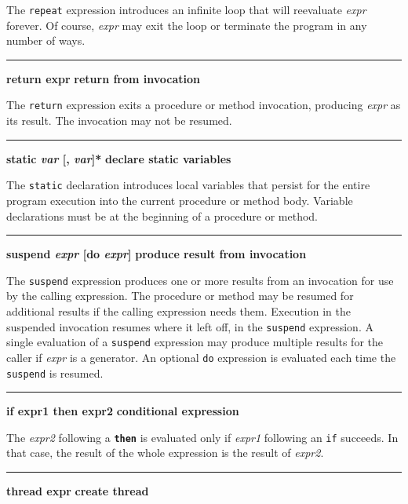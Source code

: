 \noindent
{}The \texttt{repeat} expression
introduces an infinite loop that will reevaluate \textit{expr} forever.
Of course, \textit{expr} may exit the loop or terminate the program in
any number of ways.

\bigskip\hrule\vspace{0.1cm}
\noindent
{\bf return expr } \hfill {\bf return from invocation}

\noindent
{}The \texttt{return} expression exits a procedure or method
invocation, producing \textit{expr} as its result. The invocation may
not be resumed.

\bigskip\hrule\vspace{0.1cm}
\noindent
{\bf \textbf{static} \textit{var} [, \textit{var}]* } \hfill {\bf declare static variables}

\noindent
{}The \texttt{static} declaration introduces 
local variables that persist for the entire program execution
into the current procedure or method body. Variable
declarations must be at the beginning of a procedure or method.

\bigskip\hrule\vspace{0.1cm}
\noindent
{\bf \textbf{suspend} \textit{expr} [do \textit{expr}] } \hfill {\bf produce result from invocation}

\noindent
{}The \texttt{suspend} expression produces one or more
results from an invocation for use by the calling expression. The
procedure or method may be resumed for additional results if the
calling expression needs them. Execution in the suspended invocation
resumes where it left off, in the \texttt{suspend} expression. A single
evaluation of a \texttt{suspend} expression may produce multiple
results for the caller if \textit{expr} is a
generator. An optional \texttt{do} expression is
evaluated each time the \texttt{suspend} is resumed.

\bigskip\hrule\vspace{0.1cm}
\noindent
{\bf if expr1 then expr2 } \hfill {\bf conditional expression}

\noindent
{}The \textit{expr2} following a \texttt{\bf then} is evaluated
only if \textit{expr1} following an \texttt{if} succeeds. In that case,
the result of the whole expression is the result of \textit{expr2}.


\bigskip\hrule\vspace{0.1cm}
\noindent
{\bf thread expr } \hfill {\bf create thread}

